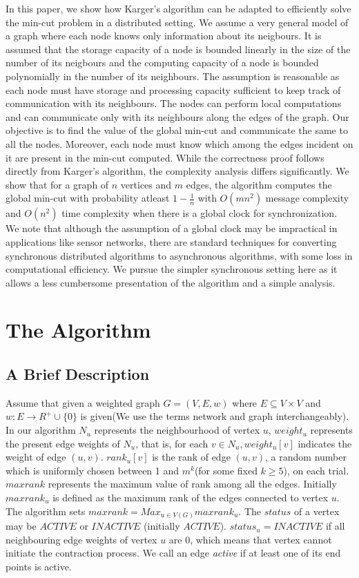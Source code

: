 \documentclass{acm_proc_article-sp}
\begin{document}
In this paper, we show how Karger's algorithm\cite{NRMM97} can be
adapted to efficiently solve the min-cut problem in a distributed
setting.  We assume a very general model of a graph where each node
knows only information about its neigbours. It is assumed that the
storage capacity of a node is bounded linearly in the size of the
number of its neigbours and  the computing capacity of a node is
bounded polynomially in the number of its neighbours. The assumption
is reasonable as each node must have storage and processing
capacity sufficient to keep track of communication with its neighbours.
The nodes can perform local computations and can communicate only with
its neighbours along the edges of the graph.  Our objective is to find
the value of the global min-cut and communicate the same to all the
nodes.  Moreover, each node must know which among the edges incident
on it are present in the min-cut computed. While the correctness proof follows directly from Karger's algorithm, the complexity analysis differs significantly. We show that  for a graph
of $n$ vertices and $m$ edges, the algorithm computes the global
min-cut with probability atleast $1-\frac{1}{n}$
with $O(mn^{2})$ message complexity and $O(n^{2})$ time complexity when
there is a global clock for synchronization.  We note that although
the assumption of a global clock may be impractical in applications
like sensor networks, there are standard techniques for converting
synchronous distributed algorithms to asynchronous algorithms, with
some loss in computational efficiency\cite{JHDS96}. We pursue the simpler synchronous setting here
as it allows a less cumbersome  presentation of the algorithm and a
simple analysis.

\section{The Algorithm}

\subsection{A Brief Description}
Assume that given a weighted graph $G = (V,E,w)$ where $E\subseteq V\times V$ and $w:E\rightarrow R^{+}\cup\{0\}$ is given(We use the terms network and graph interchangeably). In our algorithm $N_{u}$ represents the neighbourhood of vertex $u$, $weight_{u}$ represents the present edge weights of $N_{u}$, that is, for each $v\in N_{u}, weight_{u}[v]$ indicates the weight of edge $(u,v)$. $rank_{u}[v]$ is the rank of edge $(u,v)$, a random number which is uniformly chosen between 1 and $m^{k}$(for some fixed $k\geq 5$), on each trial. $maxrank$ represents the maximum value of rank among all the edges. Initially $maxrank_{u}$ is defined as the maximum rank of the edges connected to vertex $u$. The algorithm sets $maxrank = Max_{u\in V(G)} maxrank_{u}$. The $status$ of a vertex may be $ACTIVE$ or $INACTIVE$ (initially $ACTIVE$). $status_{u}=INACTIVE$ if all neighbouring edge weights of vertex $u$ are 0, which means that vertex cannot initiate the contraction process.  We call an edge {\em active} if at least one of its end points is active.
\end{document}

